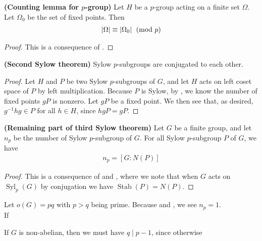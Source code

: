 \documentclass{report}
\begin{document}
\begin{theorem}
\label{THcl}
\textbf{(Counting lemma for $p$-group)} Let $H$ be a  $p$-group acting on a finite set $\Omega$. Let $\Omega_0$ be the set of fixed points. Then 
\begin{align*}
\left|\Omega\right| \equiv \left|\Omega_0\right| \pmod{p}
\end{align*}
\end{theorem}
\begin{proof}
This is a consequence of . 
\end{proof}
\begin{theorem}
\label{THsSt}
\textbf{(Second Sylow theorem)} Sylow $p$-subgroups are conjugated to each other.    
\end{theorem}
\begin{proof}
Let $H$ and $P$ be two Sylow $p$-subgroups of $G$, and let $H$ acts on left coset space of  $P$ by left multiplication. Because $P$ is Sylow, by , we know the number of fixed points $gP$ is nonzero. Let $gP$ be a fixed point. We then see that, as desired, $g^{-1}hg  \in P$ for all $h \in H$, since  $hgP=gP$. 
\end{proof}
\begin{theorem}
\label{THtSt}
\textbf{(Remaining part of third  Sylow theorem)} Let $G$ be a finite group, and let $n_p$ be the number of Sylow  $p$-subgroup of  $G$. For all Sylow  $p$-subgroup $P$ of  $G$, we have 
 \begin{align*}
n_p =  [G:N(P)]
\end{align*}
\end{theorem}
\begin{proof}
This is a consequence of  and , where we note that when $G$ acts on  $\operatorname{Syl}_p(G)$ by conjugation we have $\operatorname{Stab}(P)=N(P)$.  
\end{proof}
\begin{example}
  Let $o(G)=pq$ with $p>q$ being prime. Because  and , we see $n_p=1$. \\

If  

  If $G$ is non-abelian, then we must have $q \mid  p-1$, since otherwise  
\end{example}
\end{document}
